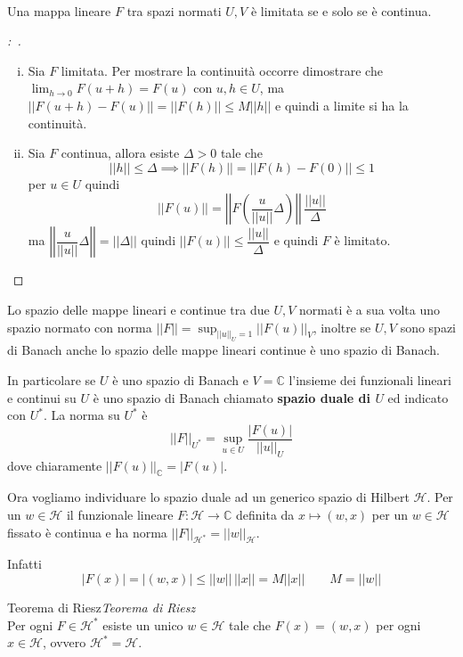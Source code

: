 \documentclass[11pt,a4paper,twoside]{book}
\newenvironment{teorema}[1][\empty]{\begin{Teorema}{
\ifx\empty#1\relax\else\mdseries\itshape#1\\\fi
}{}}{\end{Teorema}}
\newenvironment{dimo}[1][\proofname]{
	\begin{tcolorbox}[
	breakable, 
	enhanced, 
	interior hidden, 
	frame hidden, 
	borderline west = {1pt}{0pt}{gray}, 
	top=0pt, bottom=0pt, left=0pt]
\begin{proof}[#1:~]
}
{
\end{proof}
\end{tcolorbox}
}
\theoremstyle{esss}
\theoremstyle{dotless}
\numberwithin{equation}{section} %
\begin{document}
\begin{teorema}
Una mappa lineare $F$ tra spazi normati $U,V$ è limitata se e solo se è continua.
\end{teorema}
\begin{dimo}~
\begin{enumerate}[i.]
\item Sia $F$ limitata. Per mostrare la continuità occorre dimostrare che $\lim_{h\rightarrow0}F(u+h)=F(u)$ con $u,h\in U$, ma $\left|\left|F(u+h)-F(u)\right|\right|=\left|\left|F(h)\right|\right|\leq M ||h||$ e quindi a limite si ha la continuità.
\item Sia $F$ continua, allora esiste $\Delta>0$ tale che 
\[
||h||\leq\Delta \implies \left|\left| F(h) \right|\right| = \left|\left| F(h)-F(0) \right|\right|\leq 1 
\]
per $u\in U$ quindi
\[
\left|\left| F(u)\right|\right| =\left|\left|F\left(\dfrac{u}{||u||}\Delta\right)\right|\right|\, \dfrac{||u||}{\Delta}
\]
ma $\left|\left|\dfrac{u}{||u||}\Delta\right|\right|=||\Delta||$ quindi $\left|\left|F(u)\right|\right|\leq \dfrac{||u||}{\Delta}$ e quindi $F$ è limitato.\qedhere
\end{enumerate}
\end{dimo}

 Lo spazio delle mappe lineari e continue tra due $U,V$ normati è a sua volta uno spazio normato con norma $||F||=\sup_{||u||_U=1}||F(u)||_V$, inoltre se $U,V$ sono spazi di Banach anche lo spazio delle mappe lineari continue è uno spazio di Banach.

In particolare se $U$ è uno spazio di Banach e $V=\mathbb{C}$ l'insieme dei funzionali lineari e continui su $U$ è uno spazio di Banach chiamato \textbf{\boldmath spazio duale di $U$} ed indicato con $U^*$.
La norma su $U^*$ è \begin{equation} ||F||_{U^*}=\sup_{u\in U}\dfrac{|F(u)|}{||u||_U}\end{equation} dove chiaramente $||F(u)||_{\mathbb{C}}=|F(u)|$.

Ora vogliamo individuare lo spazio duale ad un generico spazio di Hilbert $\mathcal{H}$. Per un $w\in\mathcal{H}$ il funzionale lineare $F:\mathcal{H}\rightarrow\mathbb{C}$ definita da $x\mapsto(w,x)$ per un $w\in\mathcal{H}$ fissato è continua e ha norma $||F||_{\mathcal{H}^*}=||w||_{\mathcal{H}}$.

Infatti
\[
\left|F(x)\right|=|(w,x)|\leq ||w|| \,||x||=M||x|| \qquad M=||w||
\]

\begin{teorema}[Teorema di Riesz]
Per ogni $F\in\mathcal{H}^*$ esiste un unico $w\in\mathcal{H}$ tale che $F(x)=(w,x)$ per ogni $x\in\mathcal{H}$, ovvero $\mathcal{H}^*=\mathcal{H}$.
\end{teorema}
\end{document}
